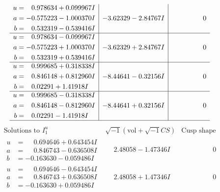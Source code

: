 \documentclass[1p]{elsarticle_modified}
\theoremstyle{definition}
\newcommand{\I}{\sqrt{-1}}
\begin{document}
$$\begin{array}{c|c|c}
\begin{aligned}
u &= \phantom{-}0.978634 + 0.099967 I \\
a &= -0.575223 - 1.000370 I \\
b &= \phantom{-}0.532319 - 0.539416 I\end{aligned}
 & -3.62329 - 2.84767 I & \phantom{-0.000000 } 0 \\ \hline\begin{aligned}
u &= \phantom{-}0.978634 - 0.099967 I \\
a &= -0.575223 + 1.000370 I \\
b &= \phantom{-}0.532319 + 0.539416 I\end{aligned}
 & -3.62329 + 2.84767 I & \phantom{-0.000000 } 0 \\ \hline\begin{aligned}
u &= \phantom{-}0.999685 + 0.318338 I \\
a &= \phantom{-}0.846148 + 0.812960 I \\
b &= \phantom{-}0.02291 + 1.41918 I\end{aligned}
 & -8.44641 - 0.32156 I & \phantom{-0.000000 } 0 \\ \hline\begin{aligned}
u &= \phantom{-}0.999685 - 0.318338 I \\
a &= \phantom{-}0.846148 - 0.812960 I \\
b &= \phantom{-}0.02291 - 1.41918 I\end{aligned}
 & -8.44641 + 0.32156 I & \phantom{-0.000000 } 0\\
 \hline 
 \end{array}$$\newpage$$\begin{array}{c|c|c}  
\text{Solutions to }I^u_{1}& \I (\text{vol} + \sqrt{-1}CS) & \text{Cusp shape}\\
 \hline 
\begin{aligned}
u &= \phantom{-}0.694646 + 0.643454 I \\
a &= \phantom{-}0.846743 - 0.636508 I \\
b &= -0.163630 - 0.059486 I\end{aligned}
 & \phantom{-}2.48058 - 1.47346 I & \phantom{-0.000000 } 0 \\ \hline\begin{aligned}
u &= \phantom{-}0.694646 - 0.643454 I \\
a &= \phantom{-}0.846743 + 0.636508 I \\
b &= -0.163630 + 0.059486 I\end{aligned}
 & \phantom{-}2.48058 + 1.47346 I & \phantom{-0.000000 } 0 \\ \hline\begin{aligned}

\end{aligned}
\end{array}$$
\end{document}

